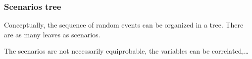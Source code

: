 \documentclass[french]{beamer}
\begin{document}
\begin{frame}
\frametitle{Scenarios tree}

Conceptually, the sequence of random events can be organized in a tree.
There are as many leaves as scenarios.
\begin{center}
\end{center}

The scenarios are not necessarily equiprobable, the variables can be correlated,\ldots

\end{frame}
\end{document}
